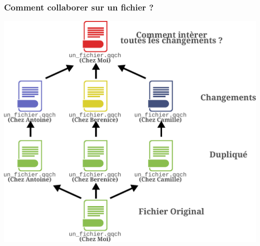 \documentclass[table,tikz,12pt,svgnames]{beamer}
\begin{document}
\begin{frame}
	\frametitle{Comment collaborer sur un fichier ? }
	\vspace{-1em}
	\begin{block}{}
    \begin{adjustwidth}{-0.5cm}{-0.5cm}{}
		\begin{center}
		{\includegraphics[scale=0.38]{images/file_share.pdf}}
		\end{center}
	\end{adjustwidth}
	\end{block}
\end{frame}
\end{document}
